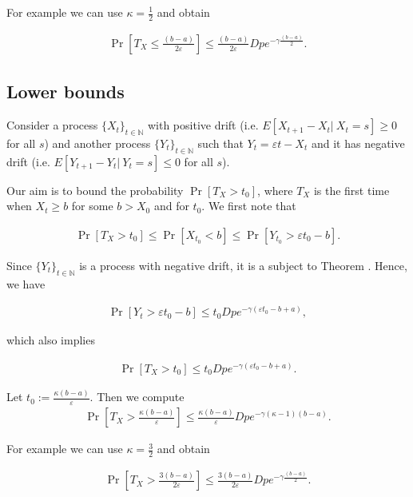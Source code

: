 \documentclass[12pt, a4paper]{article}
\theoremstyle{remark}
\begin{document}
For example we can use $\kappa = \frac{1}{2}$ and obtain

\begin{align*}
    \Pr\left[T_X \leq \frac{(b - a)}{2\varepsilon}\right] \leq \frac{(b - a)}{2\varepsilon} D p e^{-\gamma\frac{(b - a)}{2}}.
\end{align*}

\subsection{Lower bounds}

Consider a process $\{X_t\}_{t \in \mathbb{N}}$ with positive drift (i.e. $E[X_{t + 1} - X_t |\ X_t = s] \geq 0$ for all $s$) and another process $\{Y_t\}_{t \in \mathbb{N}}$ such that $Y_t = \varepsilon t - X_t$ and it has negative drift (i.e. $E[Y_{t + 1} - Y_t |\ Y_t = s] \leq 0$ for all $s$).

Our aim is to bound the probability $\Pr[T_X > t_0]$, where $T_X$ is the first time when $X_t \geq b$ for some $b > X_0$ and for $t_0$. We first note that

\begin{align*}
    \Pr[T_X > t_0] \leq \Pr[X_{t_0} < b] \leq \Pr[Y_{t_0} > \varepsilon t_0 - b].
\end{align*}

Since $\{Y_t\}_{t \in \mathbb{N}}$ is a process with negative drift, it is a subject to Theorem \cite{}. Hence, we have

\begin{align*}
    \Pr[Y_t > \varepsilon t_0 - b] \leq t_0 D p e^{-\gamma(\varepsilon t_0 - b + a)},
\end{align*}

which also implies

\begin{align*}
    \Pr[T_X > t_0] \leq t_0 D p e^{-\gamma(\varepsilon t_0 - b + a)}.
\end{align*}

Let $t_0 := \frac{\kappa (b - a)}{\varepsilon}$. Then we compute
\begin{align*}
    \Pr\left[T_X > \frac{\kappa (b - a)}{\varepsilon}\right] \leq \frac{\kappa (b - a)}{\varepsilon} D p e^{-\gamma(\kappa - 1)(b - a)}.
\end{align*}

For example we can use $\kappa = \frac{3}{2}$ and obtain

\begin{align*}
    \Pr\left[T_X > \frac{3 (b - a)}{2\varepsilon}\right] \leq \frac{3(b - a)}{2\varepsilon} D p e^{-\gamma\frac{(b - a)}{2}}.
\end{align*}
\end{document}
